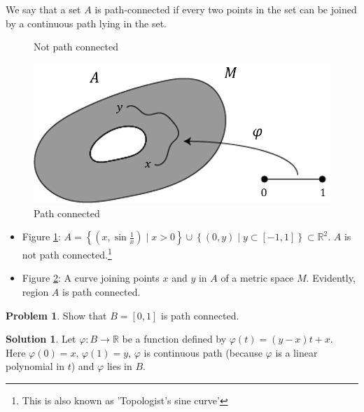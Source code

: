 \documentclass[12pt,oneside,a4paper]{book}
\newcommand{\R}{\mathds{R}}
\newcommand{\set}[1]{\left\{#1\right\}}
\theoremstyle{remark}
\theoremstyle{definition}
\newtheorem{prob}{Problem}[section]
\newtheorem*{soln}{Solution}
\begin{document}
We say that a set $ A $ is path-connected if every two points in the set can be joined by a continuous path lying in the set.
\begin{figure}[H]
    \centering
    \caption{Not path connected}
    \label{fig:path1}
\end{figure}
\begin{figure}[H]
    \centering
    \includegraphics[scale=.5]{Picture3.png}
    \caption{Path connected}
    \label{fig:path2}
\end{figure}
\begin{itemize}
    \item Figure \ref{fig:path1}: $ A=\set{(x,\sin\frac{1}{x})\mid x>0} \cup \set{(0,y)\mid y\subset [-1,1]}\subset \R^2$. $ A $ is not path connected.\footnote{This is also known as 'Topologist's sine curve'}
    \item Figure \ref{fig:path2}: A curve joining points $ x $ and $ y $ in $ A $ of a metric space $ M $. Evidently, region $ A $ is path connected. 
\end{itemize}
\begin{prob}
    Show that $ B=[0,1] $ is path connected.
\end{prob}
\begin{soln}
    Let $ \varphi: B\to\R $ be a function defined by $ \varphi(t)=(y-x)t+x $.\\
    Here $ \varphi(0)=x $, $ \varphi(1)=y $, $ \varphi $ is continuous path (because $ \varphi $ is a linear polynomial in $ t $) and $ \varphi $ lies in $ B $.
\end{soln}
\end{document}
